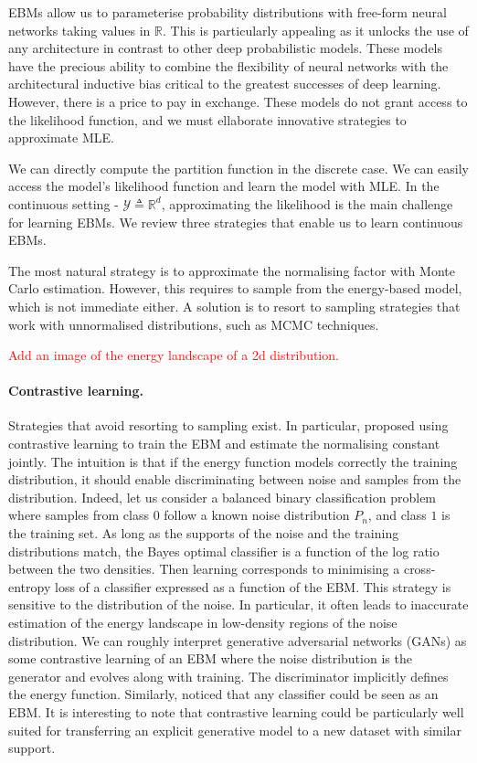 EBMs allow us to parameterise probability distributions with free-form neural networks taking values in $\mathbb{R}$. This is particularly appealing as it unlocks the use of any architecture in contrast to other deep probabilistic models. These models have the precious ability to combine the flexibility of neural networks with the architectural inductive bias critical to the greatest successes of deep learning. However, there is a price to pay in exchange. These models do not grant access to the likelihood function, and we must ellaborate innovative strategies to approximate MLE.

We can directly compute the partition function in the discrete case. We can easily access the model's likelihood function and learn the model with MLE. In the continuous setting - $\mathcal{Y} \triangleq \mathbb{R}^d$, approximating the likelihood is the main challenge for learning EBMs. We review three strategies that enable us to learn continuous EBMs.

The most natural strategy is to approximate the normalising factor with Monte Carlo estimation. However, this requires to sample from the energy-based model, which is not immediate either. A solution is to resort to sampling strategies that work with unnormalised distributions, such as MCMC techniques.

\textcolor{red}{Add an image of the energy landscape of a 2d distribution.}

\paragraph{Contrastive learning.}
Strategies that avoid resorting to sampling exist. In particular, \citet{gutmann2012noise} proposed using contrastive learning to train the EBM and estimate the normalising constant jointly. The intuition is that if the energy function models correctly the training distribution, it should enable discriminating between noise and samples from the distribution. Indeed, let us consider a balanced binary classification problem where samples from class $0$ follow a known noise distribution $P_n$, and class $1$ is the training set. As long as the supports of the noise and the training distributions match, the Bayes optimal classifier is a function of the log ratio between the two densities. Then learning corresponds to minimising a cross-entropy loss of a classifier expressed as a function of the EBM. This strategy is sensitive to the distribution of the noise. In particular, it often leads to inaccurate estimation of the energy landscape in low-density regions of the noise distribution. We can roughly interpret generative adversarial networks (GANs) as some contrastive learning of an EBM where the noise distribution is the generator and evolves along with training. The discriminator implicitly defines the energy function. Similarly, \citet{grathwohl2019your} noticed that any classifier could be seen as an EBM. It is interesting to note that contrastive learning could be particularly well suited for transferring an explicit generative model to a new dataset with similar support.

